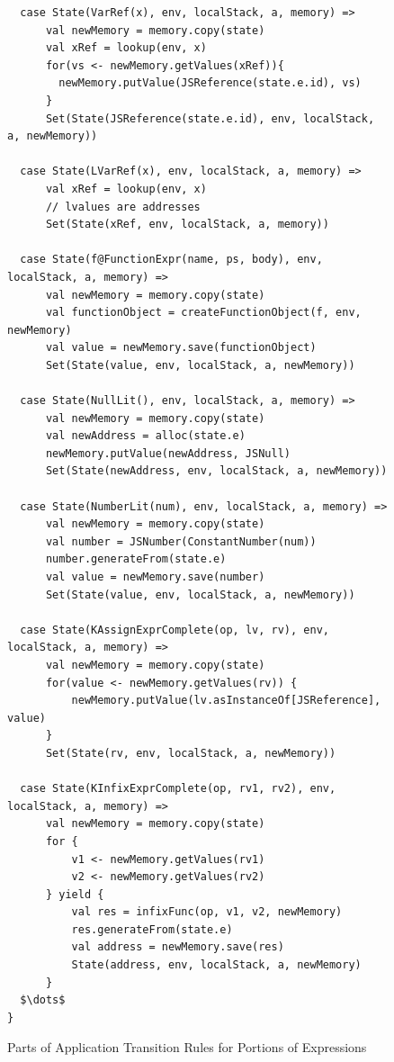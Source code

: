 \documentclass{article}
\begin{document}
\begin{figure}
\lstset{language=Scala, mathescape}
\begin{lstlisting}
  case State(VarRef(x), env, localStack, a, memory) =>
      val newMemory = memory.copy(state)
      val xRef = lookup(env, x)
      for(vs <- newMemory.getValues(xRef)){
        newMemory.putValue(JSReference(state.e.id), vs)
      }
      Set(State(JSReference(state.e.id), env, localStack, a, newMemory))

  case State(LVarRef(x), env, localStack, a, memory) =>
      val xRef = lookup(env, x)
      // lvalues are addresses
      Set(State(xRef, env, localStack, a, memory))

  case State(f@FunctionExpr(name, ps, body), env, localStack, a, memory) =>
      val newMemory = memory.copy(state)
      val functionObject = createFunctionObject(f, env, newMemory)
      val value = newMemory.save(functionObject)
      Set(State(value, env, localStack, a, newMemory))

  case State(NullLit(), env, localStack, a, memory) =>
      val newMemory = memory.copy(state)
      val newAddress = alloc(state.e)
      newMemory.putValue(newAddress, JSNull)
      Set(State(newAddress, env, localStack, a, newMemory))

  case State(NumberLit(num), env, localStack, a, memory) =>
      val newMemory = memory.copy(state)
      val number = JSNumber(ConstantNumber(num))
      number.generateFrom(state.e)
      val value = newMemory.save(number)
      Set(State(value, env, localStack, a, newMemory))

  case State(KAssignExprComplete(op, lv, rv), env, localStack, a, memory) =>
      val newMemory = memory.copy(state)
      for(value <- newMemory.getValues(rv)) {
          newMemory.putValue(lv.asInstanceOf[JSReference], value)
      }
      Set(State(rv, env, localStack, a, newMemory))

  case State(KInfixExprComplete(op, rv1, rv2), env, localStack, a, memory) =>
      val newMemory = memory.copy(state)
      for {
          v1 <- newMemory.getValues(rv1)
          v2 <- newMemory.getValues(rv2)
      } yield {
          val res = infixFunc(op, v1, v2, newMemory)
          res.generateFrom(state.e)
          val address = newMemory.save(res)
          State(address, env, localStack, a, newMemory)
      }
  $\dots$
}
\end{lstlisting}
\caption{Parts of Application Transition Rules for Portions of Expressions}
\label{fig:app-expr}
\end{figure}
\end{document}
